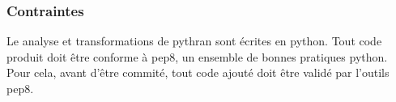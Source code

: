 \documentclass[a4paper]{article}
\begin{document}
\subsubsection{Contraintes}

Le analyse et transformations de pythran sont écrites en python. Tout
code produit doit être conforme à pep8, un ensemble de bonnes
pratiques python. Pour cela, avant d'être commité, tout code ajouté
doit être validé par l'outils pep8.

\clearpage

\appendix


\listoffigures            



\end{document}
